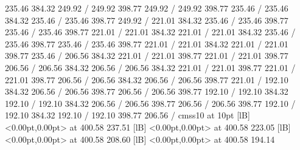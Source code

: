 {\setsolid
{} 235.46 384.32 249.92 /
 249.92 398.77 249.92 /
 249.92 398.77 235.46 /
 235.46 384.32 235.46 /
\setsolid
{} 235.46 398.77 249.92 /
\setsolid
{} 221.01 384.32 235.46 /
 235.46 398.77 235.46 /
 235.46 398.77 221.01 /
 221.01 384.32 221.01 /
\setsolid
{} 221.01 384.32 235.46 /
 235.46 398.77 235.46 /
 235.46 398.77 221.01 /
 221.01 384.32 221.01 /
\setsolid
{} 221.01 398.77 235.46 /
\setsolid
{} 206.56 384.32 221.01 /
 221.01 398.77 221.01 /
 221.01 398.77 206.56 /
 206.56 384.32 206.56 /
\setsolid
{} 206.56 384.32 221.01 /
 221.01 398.77 221.01 /
 221.01 398.77 206.56 /
 206.56 384.32 206.56 /
\setsolid
{} 206.56 398.77 221.01 /
\setsolid
{} 192.10 384.32 206.56 /
 206.56 398.77 206.56 /
 206.56 398.77 192.10 /
 192.10 384.32 192.10 /
\setsolid
{} 192.10 384.32 206.56 /
 206.56 398.77 206.56 /
 206.56 398.77 192.10 /
 192.10 384.32 192.10 /
\setsolid
{} 192.10 398.77 206.56 /
\font\picfont cmss10 at 10pt\picfont
{}  [lB] <0.00pt,0.00pt> at 400.58 237.51
  [lB] <0.00pt,0.00pt> at 400.58 223.05
  [lB] <0.00pt,0.00pt> at 400.58 208.60
  [lB] <0.00pt,0.00pt> at 400.58 194.14
\endpicture
}
